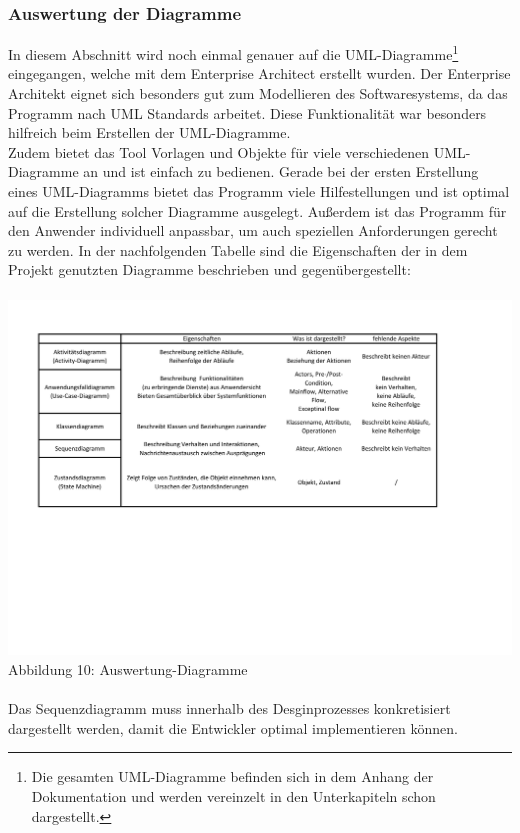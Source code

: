 \documentclass[12pt,a4paper]{article}
\begin{document}
\subsubsection*{Auswertung der Diagramme}
In diesem Abschnitt wird noch einmal genauer auf die UML-Diagramme\footnote{Die gesamten UML-Diagramme befinden sich in dem Anhang der Dokumentation und werden vereinzelt in den Unterkapiteln schon dargestellt.} eingegangen, welche mit dem Enterprise Architect erstellt wurden. Der Enterprise Architekt eignet sich besonders gut zum Modellieren des Softwaresystems, da das Programm nach UML Standards arbeitet. Diese Funktionalität war besonders hilfreich beim Erstellen der UML-Diagramme. 
\\
Zudem bietet das Tool Vorlagen und Objekte für viele verschiedenen UML-Diagramme an und ist einfach zu bedienen. Gerade bei der ersten Erstellung eines UML-Diagramms bietet das Programm viele Hilfestellungen und ist optimal auf die Erstellung solcher Diagramme ausgelegt. Außerdem ist das Programm für den Anwender individuell anpassbar, um auch speziellen Anforderungen gerecht zu werden.
\newpage
In der nachfolgenden Tabelle sind die Eigenschaften der in dem Projekt  genutzten Diagramme beschrieben und gegenübergestellt:
\\
\\
\hspace*{-10mm} 
\includegraphics[trim = 10mm 60mm 0mm 20mm,clip,scale=0.7]{Auswertung_Diagramme.pdf}
\footnotesize Abbildung 10: Auswertung-Diagramme
\normalsize
\\
\\
Das Sequenzdiagramm muss innerhalb des Desginprozesses konkretisiert dargestellt werden, damit die Entwickler optimal implementieren können.
\end{document}
